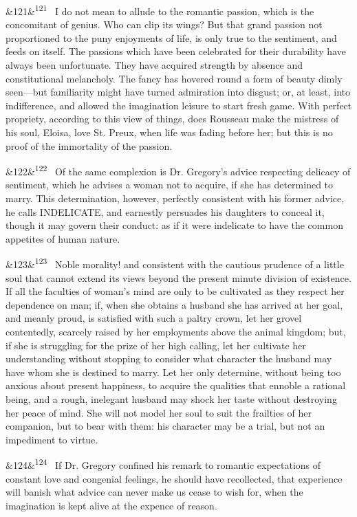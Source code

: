 \documentclass[12pt]{article}
\newcommand{\para}[1][]{\par\noindent\ifx&#1&\else\textsuperscript{\footnotesize #1}~\fi}
\begin{document}
\para[121] I do not mean to allude to the romantic passion, which is the concomitant of genius. Who can clip its wings? But that grand passion not proportioned to the puny enjoyments of life, is only true to the sentiment, and feeds on itself. The passions which have been celebrated for their durability have always been unfortunate. They have acquired strength by absence and constitutional melancholy. The fancy has hovered round a form of beauty dimly seen---but familiarity might have turned admiration into disgust; or, at least, into indifference, and allowed the imagination leisure to start fresh game. With perfect propriety, according to this view of things, does Rousseau make the mistress of his soul, Eloisa, love St. Preux, when life was fading before her; but this is no proof of the immortality of the passion.

\para[122] Of the same complexion is Dr. Gregory's advice respecting delicacy of sentiment, which he advises a woman not to acquire, if she has determined to marry. This determination, however, perfectly consistent with his former advice, he calls INDELICATE, and earnestly persuades his daughters to conceal it, though it may govern their conduct: as if it were indelicate to have the common appetites of human nature.

\para[123] Noble morality! and consistent with the cautious prudence of a little soul that cannot extend its views beyond the present minute division of existence. If all the faculties of woman's mind are only to be cultivated as they respect her dependence on man; if, when she obtains a husband she has arrived at her goal, and meanly proud, is satisfied with such a paltry crown, let her grovel contentedly, scarcely raised by her employments above the animal kingdom; but, if she is struggling for the prize of her high calling, let her cultivate her understanding without stopping to consider what character the husband may have whom she is destined to marry. Let her only determine, without being too anxious about present happiness, to acquire the qualities that ennoble a rational being, and a rough, inelegant husband may shock her taste without destroying her peace of mind. She will not model her soul to suit the frailties of her companion, but to bear with them: his character may be a trial, but not an impediment to virtue.

\para[124] If Dr. Gregory confined his remark to romantic expectations of constant love and congenial feelings, he should have recollected, that experience will banish what advice can never make us cease to wish for, when the imagination is kept alive at the expence of reason.
\end{document}
